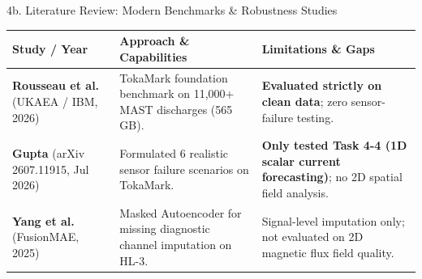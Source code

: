 \documentclass[aspectratio=169, 10pt]{beamer}
\begin{document}
\begin{frame}{4b. Literature Review: Modern Benchmarks \& Robustness Studies}
  \vspace{-2pt}
  \begin{table}[h]
    \centering
    \small
    \renewcommand{\arraystretch}{1.2}
    \begin{tabular}{P{3.0cm} P{5.1cm} P{5.1cm}}
      \toprule
      \textbf{Study / Year} & \textbf{Approach \& Capabilities} & \textbf{Limitations \& Gaps} \\
      \midrule
      \textbf{Rousseau et al.} (UKAEA / IBM, 2026) & TokaMark foundation benchmark on 11,000+ MAST discharges (565 GB). & \textbf{Evaluated strictly on clean data}; zero sensor-failure testing. \\
      \addlinespace[6pt]
      \textbf{Gupta} (arXiv 2607.11915, Jul 2026) & Formulated 6 realistic sensor failure scenarios on TokaMark. & \textbf{Only tested Task 4-4 (1D scalar current forecasting)}; no 2D spatial field analysis. \\
      \addlinespace[6pt]
      \textbf{Yang et al.} (FusionMAE, 2025) & Masked Autoencoder for missing diagnostic channel imputation on HL-3. & Signal-level imputation only; not evaluated on 2D magnetic flux field quality. \\
      \bottomrule
    \end{tabular}
  \end{table}
\end{frame}
\end{document}
